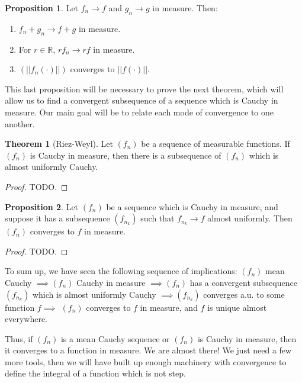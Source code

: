 \documentclass[11pt, oneside]{amsart}   	%
\theoremstyle{definition}
\newtheorem{theorem}{Theorem}[section]
\newtheorem{prop}{Proposition}[section]
\begin{document}
	\begin{prop}
		Let $f_n\rightarrow f$ and $g_n\rightarrow g$ in measure. Then:
		\begin{enumerate}
			\item $f_n + g_n\rightarrow f + g$ in measure. 
			\item For $r\in\mathbb R$, $rf_n\rightarrow rf$ in measure. 
			\item $(||f_n(\cdot)||)$ converges to $||f(\cdot)||$. 
		\end{enumerate}
	\end{prop}
	
	 This last proposition will be necessary to prove the next theorem, which will allow us to find a convergent subsequence 
	 of a sequence which is Cauchy in measure. Our main goal will be to relate each mode of convergence to one another. 
	 
	 \begin{theorem}[Riez-Weyl]
	 	Let $(f_n)$ be a sequence of measurable functions. If $(f_n)$ is Cauchy in measure, then there is a subsequence 
		of $(f_n)$ which is almost uniformly Cauchy.
	 \end{theorem}
	 
	 \begin{proof}
	 	TODO.
	 \end{proof}
	 
	 \begin{prop}
	 	Let $(f_n)$ be a sequence which is Cauchy in measure, and suppose it has a subsequence $(f_{n_k})$ such 
		that $f_{n_k}\rightarrow f$ almost uniformly. Then $(f_n)$ converges to $f$ in measure. 
	 \end{prop}
	 
	 \begin{proof}
	 	TODO.
	 \end{proof}
	 
	 To sum up, we have seen the following sequence of implications: $(f_n)$ mean Cauchy $\implies (f_n)$ Cauchy in 
	 measure $\implies (f_n)$ has a convergent subsequence $(f_{n_k})$ which is almost uniformly Cauchy $\implies 
	 (f_{n_k})$ converges a.u. to some function $f\implies$ $(f_n)$ converges to $f$ in measure, and $f$ is unique almost 
	 everywhere. 
	 
	 Thus, if $(f_n)$ is a mean Cauchy sequence or $(f_n)$ is Cauchy in measure, then it converges to a function in 
	 measure. We are almost there! We just need a few more tools, then we will have built up enough machinery with 
	 convergence to define the integral of a function which is not step. 
	 
\end{document}
